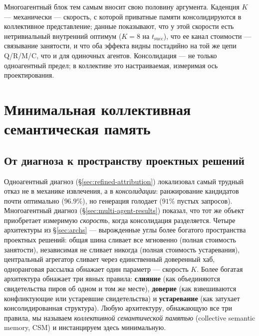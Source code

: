 \documentclass{article}
\begin{document}
Многоагентный блок тем самым вносит свою половину аргумента.
Каденция $K$ --- механически --- скорость, с которой приватные памяти
консолидируются в коллективное представление; данные показывают, что у этой скорости есть
нетривиальный внутренний оптимум ($K\!=\!8$ на $t_{\mathrm{succ}}$), что
ее канал стоимости --- связывание занятости, и что оба эффекта
видны постадийно на той же цепи Q/R/M/C, что и для одиночных
агентов. Консолидация --- не только одноагентный предел; в
коллективе это настраиваемая, измеримая ось проектирования.

\section{Минимальная коллективная семантическая память}
\label{sec:csm}
\label{sec:synthesis}

\subsection{От диагноза к пространству проектных решений}
Одноагентный диагноз (\S\ref{sec:refined-attribution}) локализовал самый трудный отказ не в механике извлечения, а в \emph{консолидации}: ранжирование кандидатов почти оптимально ($96.9\%$), но генерация голодает ($91\%$ пустых запросов). Многоагентный диагноз (\S\ref{sec:multi-agent-results}) показал, что тот же объект приобретает измеримую \emph{скорость}, когда консолидация разделяется. Четыре архитектуры из \S\ref{sec:archs} --- вырожденные углы более богатого пространства проектных решений: общая шина сливает все мгновенно (полная стоимость занятости), независимая не сливает никогда (полная стоимость устаревания), центральный агрегатор сливает через единственный доверенный хаб, одноранговая рассылка обнажает один параметр --- скорость $K$. Более богатая архитектура обнажает три явных правила: \textbf{слияние} (как объединяются свидетельства пиров об одном и том же месте), \textbf{доверие} (как взвешиваются конфликтующие или устаревшие свидетельства) и \textbf{устаревание} (как затухает консолидированная структура). Любую архитектуру, обнажающую все три правила, мы называем \emph{коллективной семантической памятью} (collective semantic memory, CSM) и инстанцируем здесь минимальную.
\end{document}
